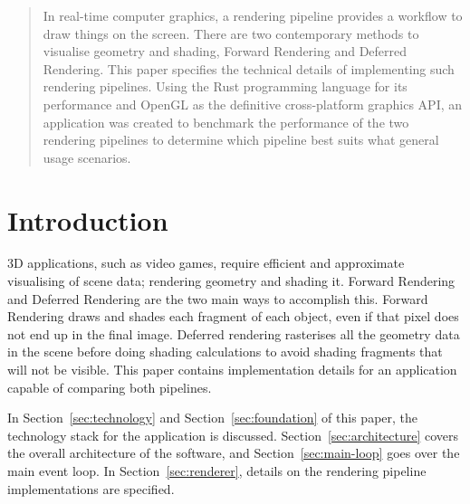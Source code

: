 
\begin{abstract}
  In real-time computer graphics, a rendering pipeline provides a workflow to draw things on the screen.
  There are two contemporary methods to visualise geometry and shading, Forward Rendering and Deferred Rendering.
  This paper specifies the technical details of implementing such rendering pipelines.
  Using the Rust programming language for its performance and OpenGL as the definitive cross-platform graphics API, an application was created to benchmark the performance of the two rendering pipelines to determine which pipeline best suits what general usage scenarios.
\end{abstract}

\newpage


\tableofcontents
\newpage
{}


\section{Introduction}
3D applications, such as video games, require efficient and approximate visualising of scene data; rendering geometry and shading it.
Forward Rendering and Deferred Rendering are the two main ways to accomplish this.
Forward Rendering draws and shades each fragment of each object, even if that pixel does not end up in the final image.
Deferred rendering rasterises all the geometry data in the scene before doing shading calculations to avoid shading fragments that will not be visible.
This paper contains implementation details for an application capable of comparing both pipelines.

In Section~\ref{sec:technology} and Section~\ref{sec:foundation} of this paper, the technology stack for the application is discussed.
Section~\ref{sec:architecture} covers the overall architecture of the software, and Section~\ref{sec:main-loop} goes over the main event loop.
In Section~\ref{sec:renderer}, details on the rendering pipeline implementations are specified.

